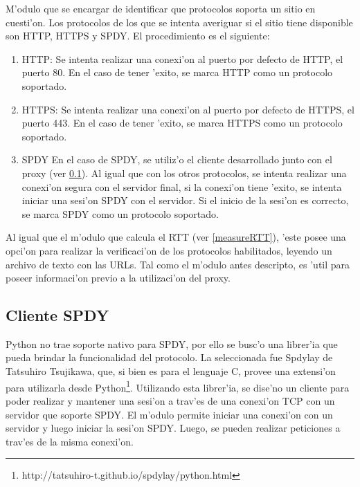 M'odulo que se encargar de identificar que protocolos soporta un sitio en cuesti'on. Los protocolos de los que se intenta averiguar si el sitio tiene disponible son HTTP, HTTPS y SPDY. El procedimiento es el siguiente: 
\begin{enumerate}
\item HTTP:
Se intenta realizar una conexi'on al puerto por defecto de HTTP, el puerto 80. En el caso de tener 'exito, se marca HTTP como un protocolo soportado.
\item HTTPS:
Se intenta realizar una conexi'on al puerto por defecto de HTTPS, el puerto 443. En el caso de tener 'exito, se marca HTTPS como un protocolo soportado.
\item SPDY
En el caso de SPDY, se utiliz'o el cliente desarrollado junto con el proxy (ver \ref{clienteSPDY}). Al igual que con los otros protocolos, se intenta realizar una conexi'on segura con el servidor final, si la conexi'on tiene 'exito, se intenta iniciar una sesi'on SPDY con el servidor. Si el inicio de la sesi'on es correcto, se marca SPDY como un protocolo soportado.
\end{enumerate}

Al igual que el m'odulo que calcula el RTT (ver \ref{measureRTT}), 'este posee una opci'on para realizar la verificaci'on de los protocolos habilitados, leyendo un archivo de texto con las URLs. Tal como el m'odulo antes descripto, es 'util para poseer informaci'on previo a la utilizaci'on del proxy.

\subsection{Cliente SPDY}
\label{clienteSPDY}

Python no trae soporte nativo para SPDY, por ello se busc'o una librer'ia que pueda brindar la funcionalidad del protocolo. La seleccionada fue Spdylay \citep{spdylay} de Tatsuhiro Tsujikawa, que, si bien es para el lenguaje C, provee una extensi'on para utilizarla desde Python\footnote{http://tatsuhiro-t.github.io/spdylay/python.html}. Utilizando esta librer'ia, se dise'no un cliente para poder realizar y mantener una sesi'on a trav'es de una conexi'on TCP con un servidor que soporte SPDY. El m'odulo permite iniciar una conexi'on con un servidor y luego iniciar la sesi'on SPDY. Luego, se pueden realizar peticiones a trav'es de la misma conexi'on.